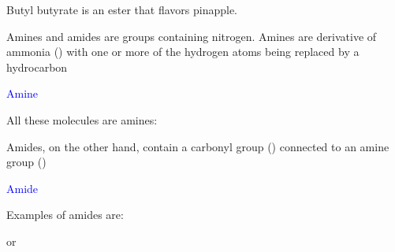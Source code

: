 \documentclass[main.tex]{subfiles}
\begin{document}
\begin{description}
\begin{marginfigure}[0cm]
\begin{center}\hspace{1cm}\end{center}
\caption{Butyl butyrate is an ester that flavors pinapple.}
\end{marginfigure}%

\item[\docfilehook{  Amines and amides}{Amines and amides}] Amines and amides are groups containing nitrogen. Amines are derivative of ammonia () with one or more of the hydrogen atoms being replaced by a hydrocarbon
\begin{center}\hspace{0.5cm}\textcolor{blue}{Amine}\end{center}
 All these molecules are amines:
\begin{center}\hspace{1cm}   \hspace{1cm}   \end{center}
Amides, on the other hand, contain a carbonyl group () connected to an amine group ()
\begin{center}    \hspace{0.5cm}\textcolor{blue}{Amide}\end{center}
Examples of amides are:
\begin{center}\hspace{1cm} or \hspace{1cm}\end{center}


\end{description}
\end{document}
